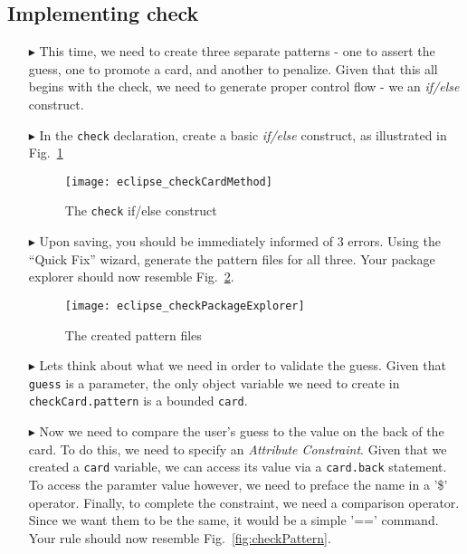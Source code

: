 \newpage
\subsection{Implementing check}
\texHeader
\hypertarget{checkCard tex}{}
 
\begin{itemize}
   
\item[$\blacktriangleright$] This time, we need to create three separate patterns - one to assert the guess, one to promote a card, and another to penalize.
Given that this all begins with the check, we need to generate proper control flow - we an \emph{if/else} construct.

\item[$\blacktriangleright$] In the \texttt{check} declaration, create a basic \emph{if/else} construct, as illustrated in Fig.~\ref{fig:checkDec}

\begin{figure}[htbp]
\begin{center}
  \texttt{[image: eclipse\_checkCardMethod]}
  \caption{The \texttt{check} if/else construct}
  \label{fig:checkDec}
\end{center}
\end{figure} 

\item[$\blacktriangleright$] Upon saving, you should be immediately informed of 3 errors. Using the ``Quick Fix'' wizard, generate the pattern files for all
three. Your package explorer should now resemble Fig.~\ref{fig:checkPatternsExplorer}.

\begin{figure}[htbp]
\begin{center}
  \texttt{[image: eclipse\_checkPackageExplorer]}
  \caption{The created pattern files}
  \label{fig:checkPatternsExplorer}
\end{center}
\end{figure} 

\item[$\blacktriangleright$] Lets think about what we need in order to validate the guess. Given that \texttt{guess} is a parameter, the only object variable
we need to create in \texttt{checkCard.pattern} is a bounded \texttt{card}.

\item[$\blacktriangleright$] Now we need to compare the user's guess to the value on the back of the card. To do this, we need to specify an \emph{Attribute
Constraint}. Given that we created a \texttt{card} variable, we can access its value via a \texttt{card.back} statement. To access the paramter
value however, we need to preface the name in a '\$' operator. Finally, to complete the constraint, we need a comparison operator. Since we want them
to be the same, it would be a simple '==' command. Your rule should now resemble Fig.~\ref{fig:checkPattern}.


\end{itemize}
